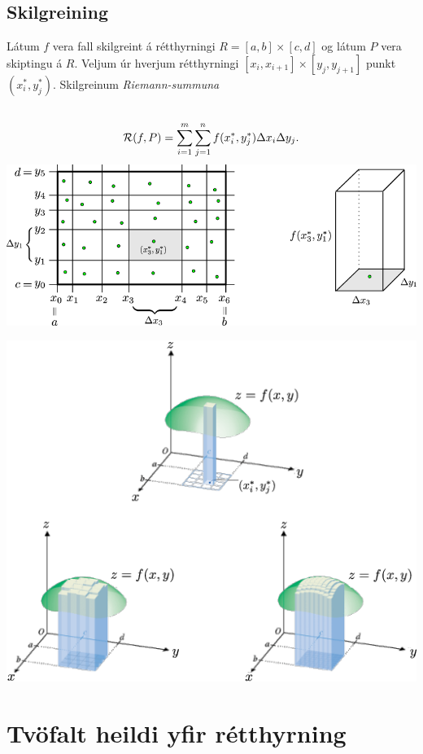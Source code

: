\documentclass[a4paper,10pt,icelandic]{sphinxmanual}
\begin{document}
\subsection{Skilgreining}
\label{Kafli4:id1}
Látum \(f\) vera fall skilgreint á rétthyrningi
\(R=[a,b]\times[c,d]\) og látum \(P\) vera skiptingu á
\(R\). Veljum úr hverjum rétthyrningi
\([x_i,x_{i+1}]\times [y_j,y_{j+1}]\) punkt \((x_i^*, y_j^*)\).
Skilgreinum \emph{Riemann-summuna}
\begin{gather}
\begin{split}\displaystyle\end{split}\notag\\\begin{split}\mathcal{R}(f,P)=\sum_{i=1}^m\sum_{j=1}^n f(x_i^*, y_j^*)\Delta x_i\Delta
  y_j.\end{split}\notag
\end{gather}
{\hfill\includegraphics[width=0.800\linewidth]{skipting2.png}\hfill}

{\hfill\includegraphics[width=0.750\linewidth]{double.png}\hfill}


\section{Tvöfalt heildi yfir rétthyrning}
\label{Kafli4:tvofalt-heildi-yfir-retthyrning}
\end{document}
